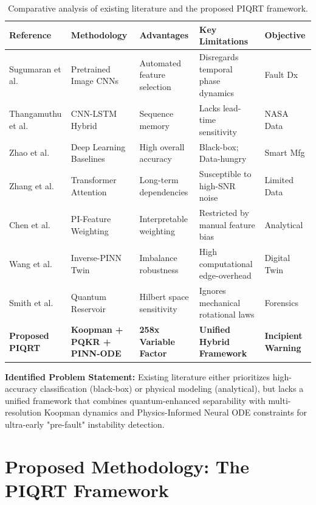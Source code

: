 \documentclass[a4paper,fleqn]{cas-dc}
\begin{document}
\begin{table}[t]
\centering
\caption{Comparative analysis of existing literature and the proposed PIQRT framework.}\label{tbl:lit_review}
\begin{tabular*}{\textwidth}{@{\extracolsep{\fill}}lllll}
\toprule
Reference & Methodology & Advantages & Key Limitations & Objective \\
\midrule
Sugumaran et al. \cite{sugumaran2025comparative} & Pretrained Image CNNs & Automated feature selection & Disregards temporal phase dynamics & Fault Dx \\
Thangamuthu et al. \cite{thangamuthu2025cnn} & CNN-LSTM Hybrid & Sequence memory & Lacks lead-time sensitivity & NASA Data \\
Zhao et al. \cite{zhao2021deep} & Deep Learning Baselines & High overall accuracy & Black-box; Data-hungry & Smart Mfg \\
Zhang et al. \cite{zhang2023transformer} & Transformer Attention & Long-term dependencies & Susceptible to high-SNR noise & Limited Data \\
Chen et al. \cite{chen2023physics} & PI-Feature Weighting & Interpretable weighting & Restricted by manual feature bias & Analytical \\
Wang et al. \cite{wang2024inverse} & Inverse-PINN Twin & Imbalance robustness & High computational edge-overhead & Digital Twin \\
Smith et al. \cite{smith2024quantum} & Quantum Reservoir & Hilbert space sensitivity & Ignores mechanical rotational laws & Forensics \\
\midrule
\textbf{Proposed PIQRT} & \textbf{Koopman + PQKR + PINN-ODE} & \textbf{258x Variable Factor} & \textbf{Unified Hybrid Framework} & \textbf{Incipient Warning} \\
\bottomrule
\end{tabular*}
\end{table}

\textbf{Identified Problem Statement:} Existing literature either prioritizes high-accuracy classification (black-box) or physical modeling (analytical), but lacks a unified framework that combines quantum-enhanced separability with multi-resolution Koopman dynamics and Physics-Informed Neural ODE constraints for ultra-early "pre-fault" instability detection.

\section{Proposed Methodology: The PIQRT Framework}
\label{sec:method}
\end{document}
